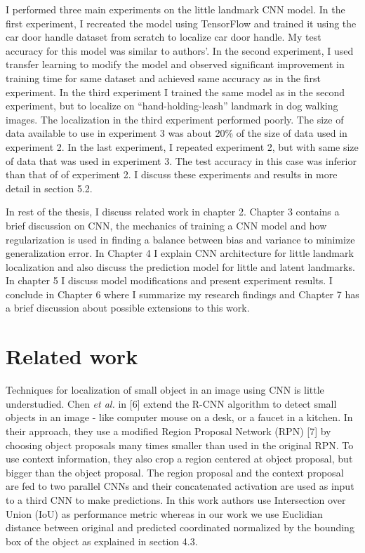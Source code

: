 \documentclass [11pt,letterpaper ,twoside ,openany ]{report}
\begin{document}
    I performed three main experiments on the little landmark CNN model. In the first experiment, I recreated the model using TensorFlow\textsuperscript{\textregistered} and trained it using the car door handle dataset from scratch to localize car door handle. My test accuracy for this model was similar to authors'. In the second experiment, I used transfer learning to modify the model and observed significant improvement in training time for same dataset and achieved same accuracy as in the first experiment. In the third experiment I trained the same model as in the second experiment, but to localize on ``hand-holding-leash'' landmark in dog walking images. The localization in the third experiment performed poorly. The size of data available to use in experiment 3 was about 20\% of the size of data used in experiment 2. In the last experiment, I repeated experiment 2, but with same size of data that was used in experiment 3. The test accuracy in this case was inferior than that of of experiment 2. I discuss these experiments and results in more detail in section 5.2.

    In rest of the thesis, I discuss related work in chapter 2. Chapter 3 contains a brief discussion on CNN, the mechanics of training a CNN model and how regularization is used in finding a balance between bias and variance to minimize generalization error. In Chapter 4 I explain CNN architecture for little landmark localization  and also discuss the prediction model for little and latent landmarks. In chapter 5 I discuss model modifications and present experiment results. I conclude in Chapter 6 where I summarize my research findings and Chapter 7 has a brief discussion about possible extensions to this work.

    \chapter{Related work}
    \doublespacing
    Techniques for localization of small object in an image using CNN is little understudied. Chen \textit{et al.} in [6] extend the R-CNN algorithm to detect small objects in an image - like  computer mouse on a desk, or a faucet in a kitchen. In their approach, they use a modified Region Proposal Network (RPN) [7] by choosing object proposals many times smaller than used in the original RPN. To use context information, they also crop a region centered at object proposal, but bigger than the object proposal. The region proposal and the context proposal are fed to two parallel CNNs and their concatenated activation are used as input to a third CNN to make predictions. In this work authors use Intersection over Union (IoU) as performance metric whereas in our work we use Euclidian distance between original and predicted coordinated normalized by the bounding box of the object as explained in section 4.3. 
\end{document}
